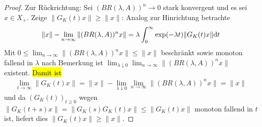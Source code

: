 \begin{proof}
\par
Zur  Rückrichtung: Sei $(BR(\lambda, A))^n\to 0$ stark konvergent und es sei $x\in X_+$. Zeige $\|G_K(t)x\|\geq\|x\|$: Analog zur Hinrichtung betrachte
\begin{equation*}
\|x\| - \lim_{n\to\infty}\|(BR(\lambda, A))^n x\| = \lambda\int_0^\infty \exp(-\lambda t)\|G_K(t)x\|\textnormal dt
\end{equation*} 
Mit $0\leq \lim_{n\to\infty}\|(BR(\lambda, A))^n x\|\leq \|x\|$ beschränkt sowie monoton fallend in $\lambda$ nach Bemerkung  ist $\lim_{\lambda\downarrow 0} \lim_{n\to\infty}\|(BR(\lambda, A))^n x\|$ existent. \hl{Damit ist}
\begin{align}\label{Grenzwert für G(t)}
\lim_{t\to\infty} \|G_K(t)x\| = \|x\| - \lim_{\lambda\downarrow0}\lim_{n\to\infty}\|(BR(\lambda, A))^n x\|=\|x\|
\end{align}
und da $(G_K(t))_{t\geq0}$  wegen $\|G_K(t+s)x\|=\|G_K(s)G_K(t)x\|\leq \|G_K(t)x\|$ monoton fallend in $t$ ist, liefert dies $\|G_K(t)x\|\geq\|x\|$.

\par






\par 

\end{proof}


